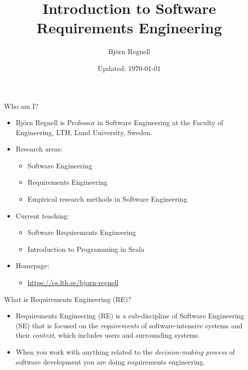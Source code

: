 \documentclass{beamer}
\author{Björn Regnell}
\title{Introduction to Software\\Requirements Engineering}
\date{\footnotesize Updated: \today}
\begin{document}
\maketitle

\begin{frame}[fragile]{Who am I?}
\begin{itemize}
\item Björn Regnell is Professor in Software Engineering at the Faculty of Engineering, LTH, Lund University, Sweden.
\item Research areas: 
\begin{itemize}
\item Software Engineering
\item Requirements Engineering 
\item Empirical research methods in Software Engineering 
\end{itemize}
\item Current teaching: 
\begin{itemize}
  \item Software Requirements Engineering
  \item Introduction to Programming in Scala 
\end{itemize}
\item Homepage: 
\begin{itemize}
\item \url{https://cs.lth.se/bjorn-regnell}
\end{itemize}
\end{itemize}
\end{frame}

\begin{frame}[fragile]{What is Requirements Engineering (RE)?}
\begin{itemize}
\item  Requirements Engineering (RE) is a sub-discipline of Software Engineering (SE) that is focused on the \textit{requirements} of software-intensive systems and their \textit{context}, which includes users and surrounding systems.
\item When you work with anything related to the \textit{decision-making process} of software development you are doing requirements engineering.
\end{itemize}
\end{frame}
\end{document}
